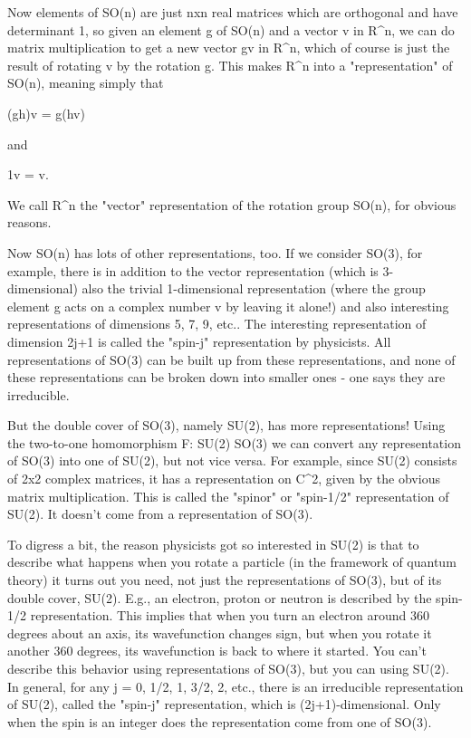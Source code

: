 Now elements of SO(n) are just nxn real matrices which are orthogonal
and have determinant 1, so given an element g of SO(n) and a vector v
in R^n, we can do matrix multiplication to get a new vector gv in R^n,
which of course is just the result of rotating v by the rotation g.
This makes R^n into a "representation" of SO(n), meaning simply that

(gh)v = g(hv) 

and 

1v = v.

We call R^n the "vector" representation of the rotation group SO(n),
for obvious reasons.  

Now SO(n) has lots of other representations, too.  If we consider
SO(3), for example, there is in addition to the vector representation
(which is 3-dimensional) also the trivial 1-dimensional representation
(where the group element g acts on a complex number v by leaving it
alone!) and also interesting representations of dimensions 5, 7, 9,
etc..  The interesting representation of dimension 2j+1 is called the
"spin-j" representation by physicists.  All representations of SO(3)
can be built up from these representations, and none of these
representations can be broken down into smaller ones - one says they
are irreducible.

But the double cover of SO(3), namely SU(2), has more representations!
Using the two-to-one homomorphism F: SU(2) \to  SO(3) we can convert
any representation of SO(3) into one of SU(2), but not vice versa.
For example, since SU(2) consists of 2x2 complex matrices, it has
a representation on C^2, given by the obvious matrix multiplication.
This is called the "spinor" or "spin-1/2" representation of SU(2).
It doesn't come from a representation of SO(3).

To digress a bit, the reason physicists got so interested in SU(2) is
that to describe what happens when you rotate a particle (in the
framework of quantum theory) it turns out you need, not just the
representations of SO(3), but of its double cover, SU(2).  E.g., an
electron, proton or neutron is described by the spin-1/2
representation.  This implies that when you turn an electron around
360 degrees about an axis, its wavefunction changes sign, but when you
rotate it another 360 degrees, its wavefunction is back to where it
started.  You can't describe this behavior using representations of
SO(3), but you can using SU(2).  In general, for any j = 0, 1/2, 1,
3/2, 2, etc., there is an irreducible representation of SU(2), called
the "spin-j" representation, which is (2j+1)-dimensional.  Only when
the spin is an integer does the representation come from one of SO(3).

